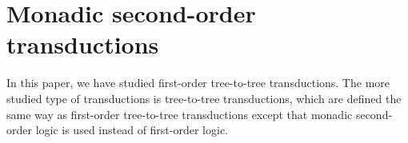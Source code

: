 \section{Monadic second-order transductions}
\label{sec:mso-trans}
In this paper, we have studied first-order tree-to-tree transductions. The more studied type of transductions is \mso tree-to-tree transductions, which are defined the same way as first-order tree-to-tree transductions except that monadic second-order logic \mso is used instead of first-order logic.  